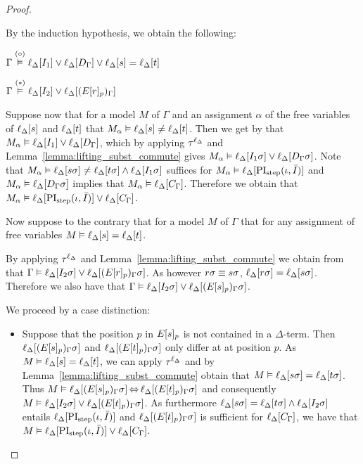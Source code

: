 \begin{proof}
\begin{description}
			By the induction hypothesis, we obtain the following: 

			$\Gamma \stackrel{(\circ)}{\vDash} \ell_{\Delta}[I_1] \lor \ell_{\Delta}[D_\Gamma] \lor \ell_{\Delta}[s]=\ell_{\Delta}[t]$

			$\Gamma \stackrel{(*)}{\vDash} \ell_{\Delta}[I_2] \lor \ell_{\Delta}[(E{[r]_{p}})_\Gamma]$

			Suppose now that for a model $M$ of $\Gamma$ and an assignment $\alpha$ of the free variables of $\ell_{\Delta}[s]$ and $\ell_{\Delta}[t]$ that $M_\alpha \vDash \ell_{\Delta}[s]\neq \ell_{\Delta}[t]$.
			Then we get by \markA{} that $M_\alpha \vDash \ell_{\Delta}[I_1] \lor \ell_{\Delta}[D_\Gamma]$, which by applying $\tau^{\ell_\Delta}$ and Lemma~\ref{lemma:lifting_subst_commute} gives $M_\alpha \vDash \ell_{\Delta}[I_1\sigma] \lor \ell_{\Delta}[D_\Gamma\sigma]$.
			Note that $M_\alpha \vDash \ell_{\Delta}[s\sigma]\neq \ell_{\Delta}[t\sigma] \land \ell_{\Delta}[I_1\sigma]$ suffices for $M_\alpha \vDash \ell_{\Delta}[\operatorname{PI}_{\mathrm{step}}(\iota, \bar I)]$ and $M_\alpha \vDash \ell_{\Delta}[D_\Gamma\sigma]$ implies that $M_\alpha \vDash \ell_{\Delta}[C_\Gamma]$.
			Therefore we obtain that 
			$M_\alpha \vDash \ell_{\Delta}[\operatorname{PI}_{\mathrm{step}}(\iota, \bar I)] \lor \ell_{\Delta}[C_\Gamma]$.

			Now suppose to the contrary that for a model $M$ of $\Gamma$ that for any assignment of free variables $M \entails \lifdeltanovar{s}\nolinebreak=\lifdeltanovar{t}$.

			By applying $\tau^{\ell_\Delta}$ and  Lemma~\ref{lemma:lifting_subst_commute} we obtain from \markB{} that
			$\Gamma \vDash \ell_{\Delta}[I_2\sigma] \lor \ell_{\Delta}[(E{[r]_{p}})_\Gamma\sigma]$.
			As however $r\sigma \equiv s\sigma$,
			$\ell_{\Delta}[r\sigma] = \ell_{\Delta}[s\sigma]$.
			Therefore we also have that 
			$\Gamma \vDash \ell_{\Delta}[I_2\sigma] \lor \ell_{\Delta}[(E{[s]_{p}})_\Gamma\sigma]$.

			We proceed by a case distinction:
			\begin{itemize}
				\item Suppose that the position $p$ in $E{[s]_{p}}$ is not contained in a $\Delta$-term.
					Then
					$\ell_{\Delta}[(E{[s]_{p}})_\Gamma\sigma]$
					and
					$\ell_{\Delta}[(E{[t]_{p}})_\Gamma\sigma]$
					only differ at at position $p$.
					As $M \vDash \ell_{\Delta}[s] = \ell_{\Delta}[t]$, we can apply $\tau^{\ell_\Delta}$ and by Lemma~\ref{lemma:lifting_subst_commute} obtain that 
					$M \vDash \ell_{\Delta}[s\sigma] = \ell_{\Delta}[t\sigma]$.
					Thus
					$M\vDash \ell_{\Delta}[(E{[s]_{p}})_\Gamma\sigma] \operatorname{\Leftrightarrow} 
					\ell_{\Delta}[(E{[t]_{p}})_\Gamma\sigma]$
					and consequently
					$M \vDash \ell_{\Delta}[I_2\sigma] \lor \ell_{\Delta}[(E{[t]_{p}})_\Gamma\sigma]$.
					As furthermore $\ell_{\Delta}[s\sigma] =\ell_{\Delta}[t\sigma] \land \ell_{\Delta}[I_2\sigma]$ entails $\ell_{\Delta}[\operatorname{PI}_{\mathrm{step}}(\iota, \bar I)]$
					and $\ell_{\Delta}[(E{[t]_{p}})_\Gamma\sigma]$ is sufficient for $\ell_{\Delta}[C_\Gamma]$,
					we have that 
					$M\vDash \ell_{\Delta}[\operatorname{PI}_{\mathrm{step}}(\iota, \bar I)] \lor \ell_{\Delta}[C_\Gamma]$.


\end{itemize}
\end{description}
\end{proof}
